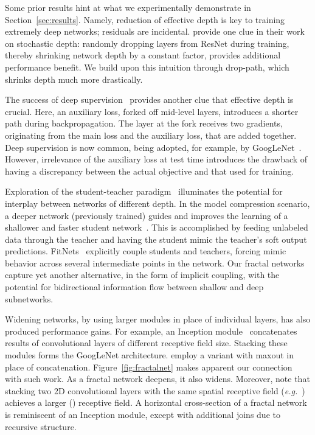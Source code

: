 \documentclass{article}
\def\eg{\emph{e.g.}}
\newcommand{\resnet}{ResNet}
\newcommand{\droppath}{drop-path}
\begin{document}
Some prior results hint at what we experimentally demonstrate in
Section~\ref{sec:results}.  Namely, reduction of effective depth is key to
training extremely deep networks; residuals are incidental.
\cite{huang2016stochasticdepth} provide one clue in their work on stochastic
depth: randomly dropping layers from {\resnet} during training, thereby
shrinking network depth by a constant factor, provides additional performance
benefit.  We build upon this intuition through {\droppath}, which shrinks depth
much more drastically.

The success of deep supervision~\citep{lee2014deeply} provides another clue
that effective depth is crucial.  Here, an auxiliary loss, forked off mid-level
layers, introduces a shorter path during backpropagation.  The layer at the
fork receives two gradients, originating from the main loss and the auxiliary
loss, that are added together.  Deep supervision is now common, being adopted,
for example, by GoogLeNet~\citep{szegedy2015inception}.  However, irrelevance
of the auxiliary loss at test time introduces the drawback of having a
discrepancy between the actual objective and that used for training.

Exploration of the student-teacher paradigm~\citep{ba2014dodeep} illuminates
the potential for interplay between networks of different depth.  In the model
compression scenario, a deeper network (previously trained) guides and improves
the learning of a shallower and faster student network~\citep{ba2014dodeep,
urban2016dodeepsfollowup}.  This is accomplished by feeding unlabeled data
through the teacher and having the student mimic the teacher's soft output
predictions.  FitNets~\citep{romero2014fitnets} explicitly couple students and
teachers, forcing mimic behavior across several intermediate points in the
network.  Our fractal networks capture yet another alternative, in the form of
implicit coupling, with the potential for bidirectional information flow
between shallow and deep subnetworks.

Widening networks, by using larger modules in place of individual layers, has
also produced performance gains.  For example, an Inception module~\citep{
szegedy2015inception} concatenates results of convolutional layers of different
receptive field size.  Stacking these modules forms the GoogLeNet architecture.
\cite{liao2015competitive} employ a variant with maxout in place of
concatenation.  Figure~\ref{fig:fractalnet} makes apparent our connection with
such work.  As a fractal network deepens, it also widens.  Moreover, note that
stacking two 2D convolutional layers with the same spatial receptive field
(\eg~) achieves a larger () receptive field.  A
horizontal cross-section of a fractal network is reminiscent of an Inception
module, except with additional joins due to recursive structure.
 
\end{document}

